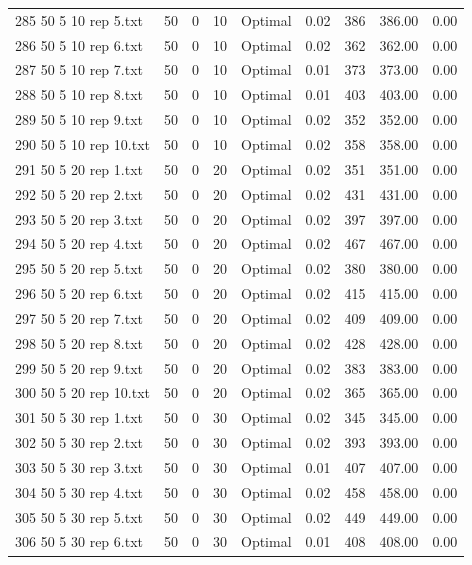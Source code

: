 \begin{longtable}{lrrllrrrr}
285 50 5 10 rep 5.txt & 50 & 0 & 10 & Optimal &  0.02 & 386 & 386.00 &  0.00\\
286 50 5 10 rep 6.txt & 50 & 0 & 10 & Optimal &  0.02 & 362 & 362.00 &  0.00\\
287 50 5 10 rep 7.txt & 50 & 0 & 10 & Optimal &  0.01 & 373 & 373.00 &  0.00\\
288 50 5 10 rep 8.txt & 50 & 0 & 10 & Optimal &  0.01 & 403 & 403.00 &  0.00\\
289 50 5 10 rep 9.txt & 50 & 0 & 10 & Optimal &  0.02 & 352 & 352.00 &  0.00\\
290 50 5 10 rep 10.txt & 50 & 0 & 10 & Optimal &  0.02 & 358 & 358.00 &  0.00\\
291 50 5 20 rep 1.txt & 50 & 0 & 20 & Optimal &  0.02 & 351 & 351.00 &  0.00\\
292 50 5 20 rep 2.txt & 50 & 0 & 20 & Optimal &  0.02 & 431 & 431.00 &  0.00\\
293 50 5 20 rep 3.txt & 50 & 0 & 20 & Optimal &  0.02 & 397 & 397.00 &  0.00\\
294 50 5 20 rep 4.txt & 50 & 0 & 20 & Optimal &  0.02 & 467 & 467.00 &  0.00\\
295 50 5 20 rep 5.txt & 50 & 0 & 20 & Optimal &  0.02 & 380 & 380.00 &  0.00\\
296 50 5 20 rep 6.txt & 50 & 0 & 20 & Optimal &  0.02 & 415 & 415.00 &  0.00\\
297 50 5 20 rep 7.txt & 50 & 0 & 20 & Optimal &  0.02 & 409 & 409.00 &  0.00\\
298 50 5 20 rep 8.txt & 50 & 0 & 20 & Optimal &  0.02 & 428 & 428.00 &  0.00\\
299 50 5 20 rep 9.txt & 50 & 0 & 20 & Optimal &  0.02 & 383 & 383.00 &  0.00\\
300 50 5 20 rep 10.txt & 50 & 0 & 20 & Optimal &  0.02 & 365 & 365.00 &  0.00\\
301 50 5 30 rep 1.txt & 50 & 0 & 30 & Optimal &  0.02 & 345 & 345.00 &  0.00\\
302 50 5 30 rep 2.txt & 50 & 0 & 30 & Optimal &  0.02 & 393 & 393.00 &  0.00\\
303 50 5 30 rep 3.txt & 50 & 0 & 30 & Optimal &  0.01 & 407 & 407.00 &  0.00\\
304 50 5 30 rep 4.txt & 50 & 0 & 30 & Optimal &  0.02 & 458 & 458.00 &  0.00\\
305 50 5 30 rep 5.txt & 50 & 0 & 30 & Optimal &  0.02 & 449 & 449.00 &  0.00\\
306 50 5 30 rep 6.txt & 50 & 0 & 30 & Optimal &  0.01 & 408 & 408.00 &  0.00\\

\end{longtable}
